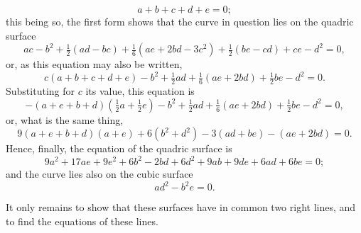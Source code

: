 \documentclass[11pt,a4paper]{article}
\theoremstyle{plain}
\begin{document}
\[
a + b + c + d + e = 0;
\]
this being so, the first form shows that the curve in question lies on the quadric surface
\[
ac - b^2 + \tfrac{1}{2}(ad - bc) + \tfrac{1}{6}(ae + 2bd - 3c^2) + \tfrac{1}{2}(be - cd) + ce - d^2 = 0,
\]
or, as this equation may also be written,
\[
c(a + b + c + d + e) - b^2 + \tfrac{1}{2}ad + \tfrac{1}{6}(ae + 2bd) + \tfrac{1}{2}be - d^2 = 0.
\]
Substituting for $c$ its value, this equation is
\[
-(a + e + b + d)(\tfrac{1}{2}a + \tfrac{1}{2}e) - b^2 + \tfrac{1}{2}ad + \tfrac{1}{6}(ae + 2bd) + \tfrac{1}{2}be - d^2 = 0,
\]
or, what is the same thing,
\[
9(a + e + b + d)(a + e) + 6(b^2 + d^2) - 3(ad + be) - (ae + 2bd) = 0.
\]
Hence, finally, the equation of the quadric surface is
\[
9a^2 + 17ae + 9e^2 + 6b^2 - 2bd + 6d^2 + 9ab + 9de + 6ad + 6be = 0;
\]
and the curve lies also on the cubic surface
\[
ad^2 - b^2 e = 0.
\]

It only remains to show that these surfaces have in common two right lines, and to find the equations of these lines.
\end{document}
